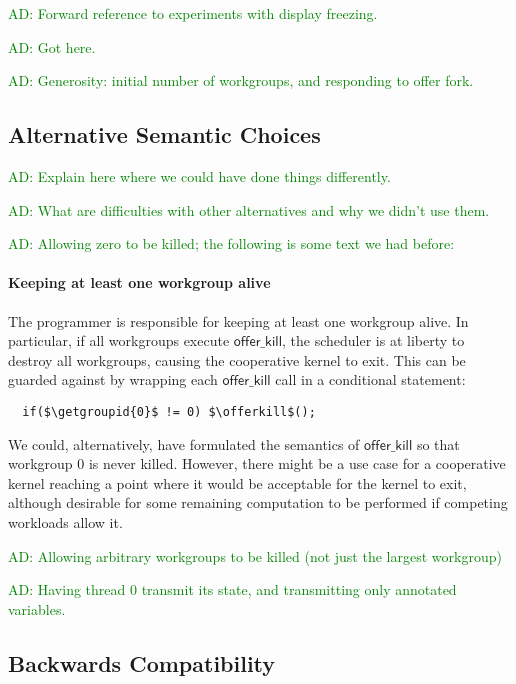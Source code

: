 \documentclass[nocopyrightspace]{sigplanconf-pldi16}
\newcommand{\ADComment}[1]{\textcolor{green}{AD: #1}}
\newcommand{\offerkill}{\mathsf{offer\_kill}}
\newcommand{\getgroupid}{\mathsf{get\_group\_id}}
\begin{document}
\ADComment{Forward reference to experiments with display freezing.}

\ADComment{Got here.}

\ADComment{Generosity: initial number of workgroups, and responding to offer fork.}

\subsection{Alternative Semantic Choices}\label{sec:semanticalternatives}

\ADComment{Explain here where we could have done things differently.}

\ADComment{What are difficulties with other alternatives and why we didn't use them.}

\ADComment{Allowing zero to be killed; the following is some text we had before:}

\paragraph{Keeping at least one workgroup alive}

The programmer is responsible for keeping at least one workgroup alive.  In particular, if all workgroups execute $\offerkill$, the scheduler is at liberty to destroy all workgroups, causing the cooperative kernel to exit.  This can be guarded against by wrapping each $\offerkill$ call in a conditional statement:

\lstset{basicstyle=\tt}
\begin{lstlisting}
  if($\getgroupid{0}$ != 0) $\offerkill$();
\end{lstlisting}
\lstset{basicstyle=\scriptsize\tt}

We could, alternatively, have formulated the semantics of $\offerkill$
so that workgroup 0 is never killed.  However, there might be a use
case for a cooperative kernel reaching a point where it would be
acceptable for the kernel to exit, although desirable for some
remaining computation to be performed if competing workloads allow it.



\ADComment{Allowing arbitrary workgroups to be killed (not just the largest workgroup)}

\ADComment{Having thread 0 transmit its state, and transmitting only annotated variables.}

\subsection{Backwards Compatibility}\label{sec:backwardscompatibility}
\end{document}
